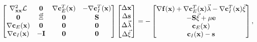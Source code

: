 \begin{equation}
 \label{eq:Newton_KKT}
 \vspace{6pt}
    \begin{split}
    \begin{bmatrix}
    \nabla^2_{\mathbf{xx}}\mathbf{\mathcal{L}} &\mathbf{0} &\nabla \mathbf{c}^T_{E}(\mathbf{x}) & -\nabla \mathbf{c}^T_{I}(\mathbf{x}) \\
    \mathbf{0} & \Vec{\Xi} & \mathbf{0} & \mathbf{S} \\
    \nabla \mathbf{c}_{E}(\mathbf{x}) &\mathbf{0} &\mathbf{0} & \mathbf{0} \\
    \nabla \mathbf{c}_{I}(\mathbf{x}) &-\mathbf{I} &\mathbf{0} &\mathbf{0}
    \end{bmatrix} \begin{bmatrix}
    \Delta\mathbf{x} \\
    \Delta\mathbf{s}\\
    \Delta \Vec{\lambda}\\
    \Delta\Vec{\xi}
    \end{bmatrix} = - \begin{bmatrix}
    \nabla \mathbf{f}(\mathbf{x})+\nabla \mathbf{c}^T_{E}(\mathbf{x})\Vec{\lambda} - \nabla \mathbf{c}^T_{I}(\mathbf{x})\Vec{\xi} \\
    -\mathbf{S} \Vec{\xi} + {\mu}\mathbf{e}\\ 
    \mathbf{c}_{E}(\mathbf{x})\\
    \mathbf{c}_{I}(\mathbf{x}) - \mathbf{s}
    \end{bmatrix},
    \end{split}
\end{equation}